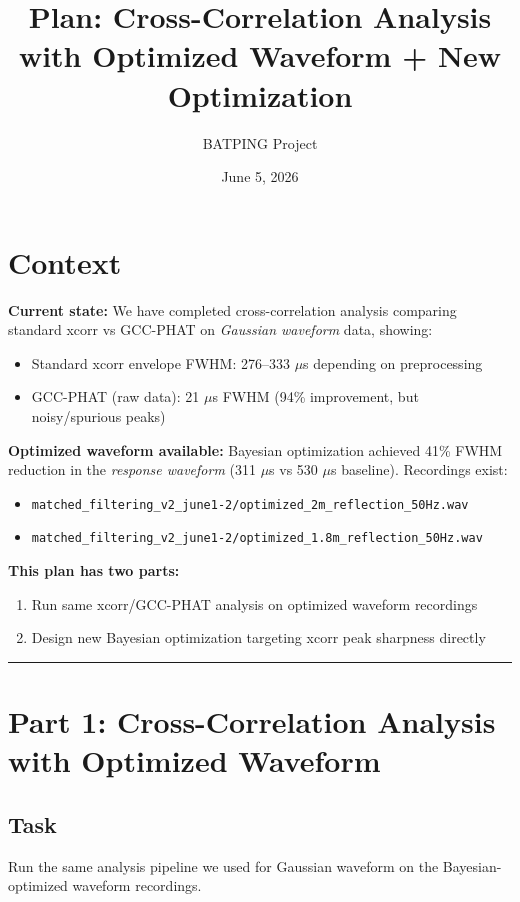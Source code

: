 \documentclass[11pt]{article}
\title{Plan: Cross-Correlation Analysis with Optimized Waveform + New Optimization}
\author{BATPING Project}
\date{June 5, 2026}
\begin{document}
\maketitle

\section*{Context}

\textbf{Current state:} We have completed cross-correlation analysis comparing standard xcorr vs GCC-PHAT on \textit{Gaussian waveform} data, showing:
\begin{itemize}
    \item Standard xcorr envelope FWHM: 276--333 $\mu$s depending on preprocessing
    \item GCC-PHAT (raw data): 21 $\mu$s FWHM (94\% improvement, but noisy/spurious peaks)
\end{itemize}

\textbf{Optimized waveform available:} Bayesian optimization achieved 41\% FWHM reduction in the \textit{response waveform} (311 $\mu$s vs 530 $\mu$s baseline). Recordings exist:
\begin{itemize}
    \item \texttt{matched\_filtering\_v2\_june1-2/optimized\_2m\_reflection\_50Hz.wav}
    \item \texttt{matched\_filtering\_v2\_june1-2/optimized\_1.8m\_reflection\_50Hz.wav}
\end{itemize}

\textbf{This plan has two parts:}
\begin{enumerate}
    \item Run same xcorr/GCC-PHAT analysis on optimized waveform recordings
    \item Design new Bayesian optimization targeting xcorr peak sharpness directly
\end{enumerate}

\hrule
\vspace{1em}

\section{Part 1: Cross-Correlation Analysis with Optimized Waveform}

\subsection{Task}
Run the same analysis pipeline we used for Gaussian waveform on the Bayesian-optimized waveform recordings.
\end{document}
